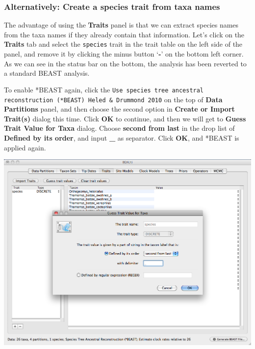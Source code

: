 \documentclass[12pt]{article}
\begin{document}
\medskip{}


\subsubsection*{Alternatively: Create a species trait from taxa names}

The advantage of using the {\bf Traits} panel is that we can extract species names from the taxa names if they already contain that information. Let's click on the {\bf Traits} tab and select the \texttt{species} trait in the trait table on the left side of the panel, and remove it by clicking the minus button `\textbf{-}' on the bottom left corner. As we can see in the status bar on the bottom, the analysis has been reverted to a standard BEAST analysis.

To enable *BEAST again, click the \texttt{Use species tree ancestral reconstruction (*BEAST) Heled \& Drummond 2010} on the top of {\bf Data Partitions} panel, and then choose the second option in {\bf Create or Import Trait(s)} dialog this time. Click \textbf{OK} to continue, and then we will get to {\bf Guess Trait Value for Taxa} dialog. Choose \textbf{second from last} in the drop list of \textbf{Defined by its order}, and input \textbf{\_} as separator. Click \textbf{OK}, and *BEAST is applied again.

\medskip{}

\includegraphics[scale=0.4]{figures/BEAUti_GuessTrait}

\medskip{}

\medskip{}
\end{document}
